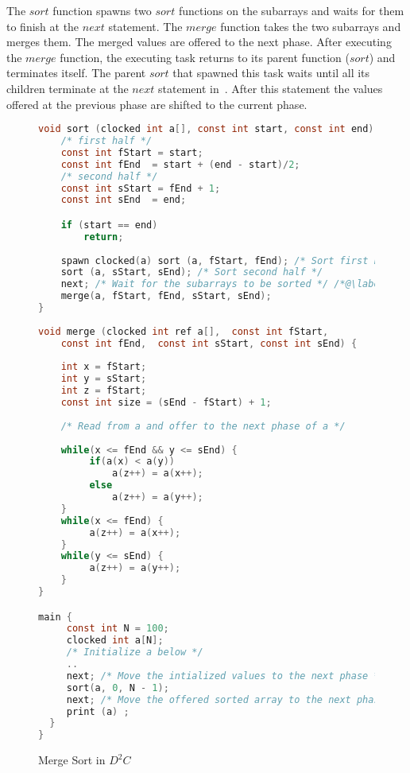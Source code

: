 \documentclass[10pt, conference, compsocconf]{IEEEtran}
\begin{document}
The $sort$ function spawns two $sort$ functions on the subarrays
and waits for them to finish at the $next$ statement.
The $merge$ function takes the two subarrays and merges them.
The merged values are offered to the next phase. 
After executing  the $merge$ function, the executing task
 returns to its parent function ($sort$) and terminates
itself.  The parent $sort$ that spawned this task waits until all its children
terminate at the $next$ statement in~. After this statement
the values offered at the previous phase are shifted to the current phase.




\begin{figure}[htbp]
\begin{lstlisting}[language=C]
void sort (clocked int a[], const int start, const int end)  {
    /* first half */
    const int fStart = start;
    const int fEnd  = start + (end - start)/2;
    /* second half */
    const int sStart = fEnd + 1;
    const int sEnd  = end;

    if (start == end)
        return;
        	
    spawn clocked(a) sort (a, fStart, fEnd); /* Sort first half */ 
    sort (a, sStart, sEnd); /* Sort second half */ 
    next; /* Wait for the subarrays to be sorted */ /*@\label{line:next1}@*/;
    merge(a, fStart, fEnd, sStart, sEnd);
}
    
void merge (clocked int ref a[],  const int fStart, 
    const int fEnd,  const int sStart, const int sEnd) {
    	
    int x = fStart;
    int y = sStart;
    int z = fStart;
    const int size = (sEnd - fStart) + 1;
  
    /* Read from a and offer to the next phase of a */   
 
    while(x <= fEnd && y <= sEnd) {
         if(a(x) < a(y))
             a(z++) = a(x++);
         else
             a(z++) = a(y++);
    }
    while(x <= fEnd) {
         a(z++) = a(x++);
    }
    while(y <= sEnd) {
         a(z++) = a(y++);
    }
}

main {
     const int N = 100;
     clocked int a[N]; 
     /* Initialize a below */
     ..
     next; /* Move the intialized values to the next phase */ 
     sort(a, 0, N - 1);
     next; /* Move the offered sorted array to the next phase */
     print (a) ; 
  }
}
\end{lstlisting}
\caption{Merge Sort in $D^2C$}
\label{fig:mergesort}
\end{figure}
\end{document}

